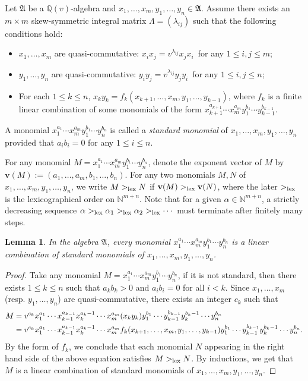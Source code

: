 \documentclass[reqno,12pt]{amsart}
\numberwithin{equation}{section}
\theoremstyle{plain} %
\newtheorem{lemma}[theorem]{\bf Lemma}
\theoremstyle{definition} %
\begin{document}
Let $\mathfrak{A}$ be a $\mathbb{Q}(v)$-algebra and $x_1,\ldots, x_m, y_1,\ldots, y_n\in \mathfrak{A}$. Assume there exists an $m\times m$ skew-symmetric integral matrix $\Lambda=(\lambda_{ij})$ such that the following conditions hold:
\begin{itemize}
    \item $x_1,\ldots, x_m$ are quasi-commutative: $x_ix_j=v^{\lambda_{ij}}x_jx_i$~for any $1\leq i,j\leq m$;
    \item $y_1,\ldots, y_n$ are quasi-commutative: $y_iy_j=v^{\lambda_{ij}}y_jy_i$~for any $1\leq i,j\leq n$;
    \item For each $1\leq k\leq n$, $x_ky_k=f_k(x_{k+1},\ldots, x_m,y_1,\ldots, y_{k-1})$, where $f_k$ is a finite linear combination of some monomials of the form $x_{k+1}^{a_{k+1}}\cdots x_m^{a_m}y_1^{b_1}\cdots y_{k-1}^{b_{k-1}}.$
\end{itemize}
A monomial $x_1^{a_1}\cdots x_m^{a_m}y_1^{b_1}\cdots y_n^{b_n}$ is called a {\em standard monomial} of $x_1,\ldots, x_m,y_1,\ldots, y_n$ provided that $a_ib_i=0$ for any $1\leq i\leq n$.

For any monomial $M=x_1^{a_1}\cdots x_m^{a_m}y_1^{b_1}\cdots y_n^{b_n}$, denote the exponent vector of $M$ by $\mathbf{v}(M):=(a_1,\ldots, a_m,b_1,\ldots, b_n)$. For any two monomials $M, N$ of $x_1,\ldots, x_m,y_1,\ldots, y_n$, we write $M>_{\rm lex}N$ if $\mathbf{v}(M)>_{\rm lex} \mathbf{v}(N)$, where the later $>_{\rm lex}$ is the lexicographical order on $\mathbb{N}^{m+n}$. Note that for a given $\alpha\in \mathbb{N}^{m+n}$,  a strictly decreasing sequence $\alpha>_{\rm lex}\alpha_1>_{\rm lex}\alpha_2>_{\rm lex}\cdots$ must terminate after finitely many steps.
\begin{lemma}\label{lem:rewritting-system}
In the algebra $\mathfrak{A}$, every monomial $x_1^{a_1}\cdots x_m^{a_m}y_1^{b_1}\cdots y_n^{b_n}$ is a linear combination of standard monomials of $x_1,\ldots, x_m,y_1,\ldots, y_n$.
\end{lemma}
\begin{proof}
Take any monomial $M=x_1^{a_1}\cdots x_m^{a_m}y_1^{b_1}\cdots y_n^{b_n}$, if it is not standard, then there exists $1\leq k\leq n$ such that $a_kb_k>0$ and $a_ib_i=0$ for all $i<k$. Since $x_1,\ldots, x_m$ (resp. $y_1,\ldots, y_n$) are quasi-commutative, there exists an integer $c_k$ such that
\begin{align*}
M&=v^{c_k}x_1^{a_1}\cdots x_{k-1}^{a_{k-1}}x_{k}^{a_k-1}\cdots x_m^{a_m}(x_ky_k)y_1^{b_1}\cdots y_{k-1}^{b_{k-1}}y_{k}^{b_k-1}\cdots y_n^{b_n}\notag\\
&=v^{c_k}x_1^{a_1}\cdots x_{k-1}^{a_{k-1}}x_{k}^{a_k-1}\cdots x_m^{a_m}f_k(x_{k+1},\ldots, x_m,y_1,\ldots, y_{k-1})y_1^{b_1}\cdots y_{k-1}^{b_{k-1}}y_{k}^{b_k-1}\cdots y_n^{b_n}.
\end{align*}
By the form of $f_k$, we conclude that each monomial $N$ appearing in the right hand side of the above equation satisfies $M>_{\rm lex}N$. By inductions, we get that $M$ is a linear combination of standard monomials of $x_1,\ldots, x_m,y_1,\ldots, y_n$.
\end{proof}
\end{document}
